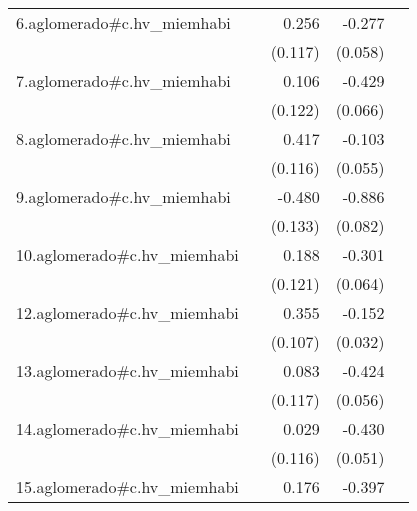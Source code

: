 {\begin{longtable}{l*{4}{D{.}{.}{-1}}}
\addlinespace
6.aglomerado#c.hv\_miemhabi&                     &       0.256\sym{*}  &      -0.277\sym{***}&                     \\
            &                     &     (0.117)         &     (0.058)         &                     \\
\addlinespace
7.aglomerado#c.hv\_miemhabi&                     &       0.106         &      -0.429\sym{***}&                     \\
            &                     &     (0.122)         &     (0.066)         &                     \\
\addlinespace
8.aglomerado#c.hv\_miemhabi&                     &       0.417\sym{***}&      -0.103         &                     \\
            &                     &     (0.116)         &     (0.055)         &                     \\
\addlinespace
9.aglomerado#c.hv\_miemhabi&                     &      -0.480\sym{***}&      -0.886\sym{***}&                     \\
            &                     &     (0.133)         &     (0.082)         &                     \\
\addlinespace
10.aglomerado#c.hv\_miemhabi&                     &       0.188         &      -0.301\sym{***}&                     \\
            &                     &     (0.121)         &     (0.064)         &                     \\
\addlinespace
12.aglomerado#c.hv\_miemhabi&                     &       0.355\sym{***}&      -0.152\sym{***}&                     \\
            &                     &     (0.107)         &     (0.032)         &                     \\
\addlinespace
13.aglomerado#c.hv\_miemhabi&                     &       0.083         &      -0.424\sym{***}&                     \\
            &                     &     (0.117)         &     (0.056)         &                     \\
\addlinespace
14.aglomerado#c.hv\_miemhabi&                     &       0.029         &      -0.430\sym{***}&                     \\
            &                     &     (0.116)         &     (0.051)         &                     \\
\addlinespace
15.aglomerado#c.hv\_miemhabi&                     &       0.176         &      -0.397\sym{***}&                     \\

\end{longtable}}
